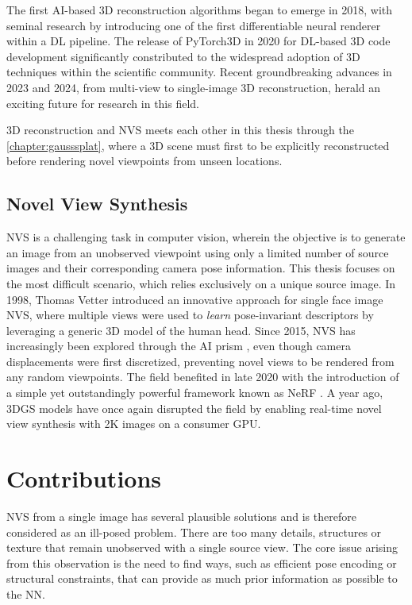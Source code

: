 The first \ac{AI}-based 3D reconstruction algorithms began to emerge in 2018, with seminal research by \citep{kato2018neural} introducing one of the first differentiable neural renderer within a \ac{DL} pipeline. The release of PyTorch3D \citep{ravi2020pytorch3d} in 2020 for \ac{DL}-based 3D code development significantly constributed to the widespread adoption of 3D techniques within the scientific community. Recent groundbreaking advances in 2023 and 2024, from multi-view \citep{li2023neuralangelo} to single-image \citep{voleti2024sv3d} 3D reconstruction, herald an exciting future for research in this field.

3D reconstruction and \ac{NVS} meets each other in this thesis through the \autoref{chapter:gausssplat}, where a 3D scene must first to be explicitly reconstructed before rendering novel viewpoints from unseen locations. 

\subsection{Novel View Synthesis}
\ac{NVS} is a challenging task in computer vision, wherein the objective is to generate an image from an unobserved viewpoint using only a limited number of source images and their corresponding camera pose information. This thesis focuses on the most difficult scenario, which relies exclusively on a unique source image. In 1998, Thomas Vetter introduced an innovative approach \citep{vetter1998synthesis} for single face image \ac{NVS}, where multiple views were used to \textit{learn} pose-invariant descriptors by leveraging a generic 3D model of the human head. Since 2015, \ac{NVS} has increasingly been explored through the \ac{AI} prism \citep{yang2015weakly}, even though camera displacements were first discretized, preventing novel views to be rendered from any random viewpoints. The field benefited in late 2020 with the introduction of a simple yet outstandingly powerful framework known as \ac{NeRF} \citep{mildenhall2020nerf}. A year ago, 3D\ac{GS} models have once again disrupted the field by enabling real-time novel view synthesis with 2K  images on a consumer \ac{GPU}. 


\section{Contributions}
\ac{NVS} from a single image has several plausible solutions and is therefore considered as an ill-posed problem. There are too many details, structures or texture that remain unobserved with a single source view. The core issue arising from this observation is the need to find ways, such as efficient pose encoding or structural constraints, that can provide as much prior information as possible to the \ac{NN}. 

